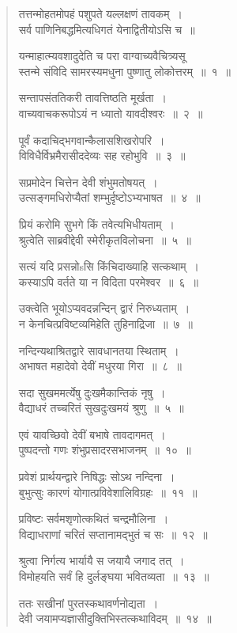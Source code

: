 \documentclass[11pt, openany]{book}
\begin{document}
\begin{multicols}{2}
\noindent
\begin{quote}
{\qt तत्तन्मोहतमोपहं पशुपते यल्लक्षणं तावकम्~।\\
सर्व पाणिनिबद्धमित्यधिगतं येनाद्वितीयोऽसि च~॥}

{\mbh यन्माहात्म्यवशादुदेति च परा वाग्वाच्यवैचित्र्यसू \textendash\ \\
स्तन्मे संविदि सामरस्यमधुना पुष्णातु लोकोत्तरम्~॥~१~॥

सन्तापसंततिकरी तावत्तिष्ठति मूर्खता~।\\
वाच्यवाचकरूपोऽयं न ध्यातो यावदीश्वरः~॥~२~॥

पूर्वं कदाचिद्भगवान्कैलासशिखरोपरि~।\\
विविधैर्विभ्रमैरासीददेव्यः सह रहोभुवि~॥~३~॥

सप्रमोदेन चित्तेन देवी शंभुमतोषयत्~।\\
उत्सङ्गमधिरोप्यैतां शम्भुर्दृष्टोऽभ्यभाषत~॥~४~॥

प्रियं करोमि सुभगे किं तवेत्यभिधीयताम्~।\\
श्रुत्वेति साब्रवीद्देवी स्मेरीकृतविलोचना~॥~५~॥

सत्यं यदि प्रसन्नोsसि किंचिदाख्याहि सत्कथाम्~।\\
कस्याऽपि वर्तते या न विदिता परमेश्वर~॥~६~॥

उक्त्वेति भूयोऽप्यवदन्नन्दिन् द्वारं निरुध्यताम्~।\\
न केनचित्प्रविष्टव्यमिहेति तुहिनाद्रिजा~॥~७~॥

नन्दिन्यथाश्रितद्वारे सावधानतया स्थिताम्~।\\
अभाषत महादेवो देवीं मधुरया गिरा~॥~८~॥

सदा सुखममर्त्येषु दुःखमैकान्तिकं नृषु~।\\
वैद्याधरं तच्चरितं सुखदुःखमयं श्रुणु~॥~५~॥

एवं यावच्छिवो देवीं बभाषे तावदागमत्~।\\
पुष्पदन्तो गणः शंभुप्रसादरसभाजनम्~॥~१०~॥

प्रवेशं प्रार्थयन्द्वारे निषिद्धः सोऽथ नन्दिना~।\\
बुभुत्सुः कारणं योगात्प्रविवेशालिविग्रहः~॥~११~॥

प्रविष्टः सर्वमशृणोत्कथितं चन्द्रमौलिना~।\\
विद्याधराणां चरितं सप्तानामद्भुतं च सः~॥~१२~॥

श्रुत्वा निर्गत्य भार्यायै स जयायै जगाद तत्~।\\
विमोहयति सर्वं हि दुर्लङ्घया भवितव्यता~॥~१३~॥

ततः सखीनां पुरतस्कथावर्णनोद्यता~।\\
देवी जयामप्यज्ञासीदुक्तिभिस्तत्कथाविदम्~॥~१४~॥

}
\end{quote}
\end{multicols}
\end{document}
